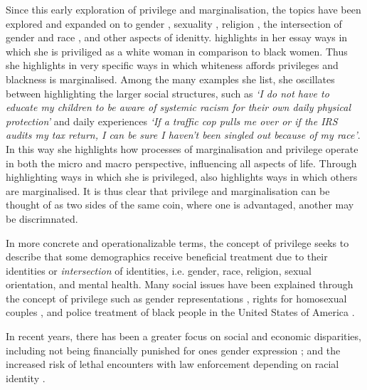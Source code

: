 Since this early exploration of privilege and marginalisation, the topics have been explored and expanded on to gender \citep{Beauvoir:1953,Butler:1990,McIntosh:1988}, sexuality \citep{Foucault:1978}, religion \citep{Beaman:2003}, the intersection of gender and race \citep{Crenshaw:1989}, and other aspects of idenitty. \cite{McIntosh:1988} highlights in her essay ways in which she is priviliged as a white woman in comparison to black women. Thus she highlights in very specific ways in which whiteness affords privileges and blackness is marginalised. Among the many examples she list, she oscillates between highlighting the larger social structures, such as \textit{`I do not have to educate my children to be aware of systemic racism for their own daily physical protection'} and daily experiences \textit{`If a traffic cop pulls me over or if the IRS audits my tax return, I can be sure I haven't been singled out because of my race'}. In this way she highlights how processes of marginalisation and privilege operate in both the micro and macro perspective, influencing all aspects of life. Through highlighting ways in which she is privileged, \cite{McIntosh:1988} also highlights ways in which others are marginalised. It is thus clear that privilege and marginalisation can be thought of as two sides of the same coin, where one is advantaged, another may be discrimnated.

In more concrete and operationalizable terms, the concept of privilege seeks to describe that some demographics receive beneficial treatment due to their identities or \textit{intersection} of identities, i.e. gender, race, religion, sexual orientation, and mental health. Many social issues have been explained through the concept of privilege such as gender representations \citep{Butler:1990}, rights for homosexual couples \citep{Foucault:1978}, and police treatment of black people in the United States of America \citep{Voigt:2017}.

In recent years, there has been a greater focus on social and economic disparities, including not being financially punished for ones gender expression \citep{Lombardi:2002}; and the increased risk of lethal encounters with law enforcement depending on racial identity \citep{Zack:2015}.

